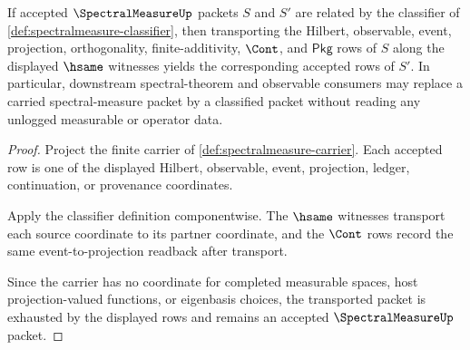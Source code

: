 \begin{theorem}
\label{thm:spectralmeasure-hsame-stability}
If accepted $\SpectralMeasureUp$ packets $S$ and $S'$ are related by the classifier of \autoref{def:spectralmeasure-classifier}, then transporting the Hilbert, observable, event, projection, orthogonality, finite-additivity, $\Cont$, and $\mathsf{Pkg}$ rows of $S$ along the displayed $\hsame$ witnesses yields the corresponding accepted rows of $S'$. In particular, downstream spectral-theorem and observable consumers may replace a carried spectral-measure packet by a classified packet without reading any unlogged measurable or operator data.
\end{theorem}
\begin{proof}
Project the finite carrier of \autoref{def:spectralmeasure-carrier}. Each accepted row is one of the displayed Hilbert, observable, event, projection, ledger, continuation, or provenance coordinates.

Apply the classifier definition componentwise. The $\hsame$ witnesses transport each source coordinate to its partner coordinate, and the $\Cont$ rows record the same event-to-projection readback after transport.

Since the carrier has no coordinate for completed measurable spaces, host projection-valued functions, or eigenbasis choices, the transported packet is exhausted by the displayed rows and remains an accepted $\SpectralMeasureUp$ packet.
\end{proof}


